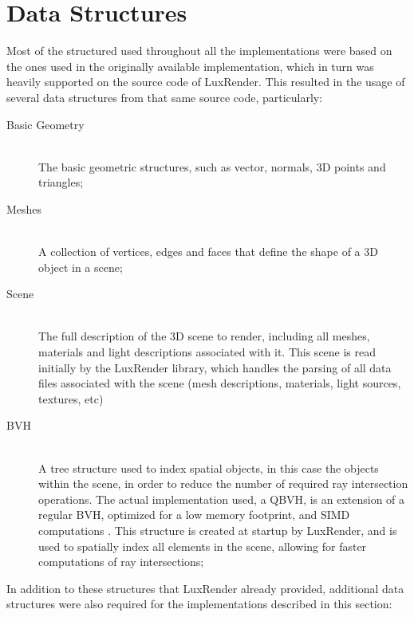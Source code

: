 \documentclass[main.tex]{subfiles}
\begin{document}
\section{Data Structures} \label{section:data_structures}

Most of the structured used throughout all the implementations were based on the ones used in the originally available implementation, which in turn was heavily supported on the source code of LuxRender. This resulted in the usage of several data structures from that same source code, particularly:

\begin{description}
\item[Basic Geometry] \hfill \\
  The basic geometric structures, such as vector, normals, 3D points and triangles;

\item[Meshes] \hfill \\
  A collection of vertices, edges and faces that define the shape of a 3D object in a scene;

\item[Scene] \hfill \\
  The full description of the 3D scene to render, including all meshes, materials and light descriptions associated with it. This scene is read initially by the LuxRender library, which handles the parsing of all data files associated with the scene (mesh descriptions, materials, light sources, textures, etc)

\item[\acl{BVH}] \hfill \\
  A tree structure used to index spatial objects, in this case the objects within the scene, in order to reduce the number of required ray intersection operations. The actual implementation used, a \acf{QBVH}, is an extension of a regular \acs{BVH}, optimized for a low memory footprint, and \acs{SIMD} computations \cite{dammertz2008shallow,Stich2009hpg}. This structure is created at startup by LuxRender, and is used to spatially index all elements in the scene, allowing for faster computations of ray intersections;

\end{description}

In addition to these structures that LuxRender already provided, additional data structures were also required for the implementations described in this section:
\end{document}
